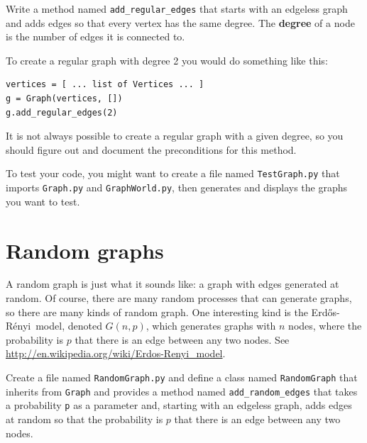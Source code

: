 \documentclass[10pt]{book}
\begin{document}
\begin{ex}

Write a method named \verb"add_regular_edges" that starts with an
edgeless graph and adds edges so that every vertex has the same
degree.  The {\bf degree} of a node is the number of edges it is
connected to.

To create a regular graph with degree 2 you would do something
like this:

\begin{verbatim}
vertices = [ ... list of Vertices ... ]
g = Graph(vertices, [])
g.add_regular_edges(2)
\end{verbatim} 

It is not always possible to create a regular graph
with a given degree, so you should figure out and document the
preconditions for this method.

To test your code, you might want to create a file named
{\tt TestGraph.py} that imports {\tt Graph.py} and
{\tt GraphWorld.py}, then generates and displays the graphs
you want to test.

\end{ex}


\newcommand{\Erdos}{Erd\H{o}s}
\newcommand{\Renyi}{R\'{e}nyi}

\section{Random graphs}

A random graph is just what it sounds like: a graph with edges
generated at random.  Of course, there are many random processes that
can generate graphs, so there are many kinds of random graph.  One
interesting kind is the \Erdos-\Renyi~model, denoted $G(n,p)$, which
generates graphs with $n$ nodes, where the probability is $p$ that
there is an edge between any two nodes.  See
\url{http://en.wikipedia.org/wiki/Erdos-Renyi_model}.
\index{\Erdos-\Renyi~model}

\begin{ex}
\label{ex.randomgraph}

Create a file named {\tt RandomGraph.py} and define a class named 
{\tt RandomGraph} that inherits from {\tt Graph} and provides a method
named \verb"add_random_edges" that takes a probability {\tt p} as a
parameter and, starting with an edgeless graph, adds edges at random
so that the probability is $p$ that there is an edge between any two
nodes.

\end{ex}
\end{document}
